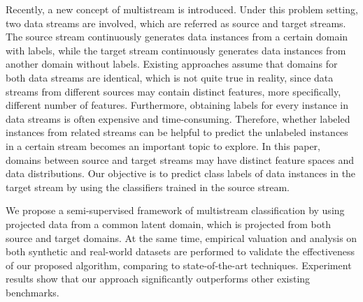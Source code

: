 Recently, a new concept of multistream is introduced. Under this problem setting, 
two data streams are involved, which are referred as source and target streams. The 
source stream continuously generates data instances from a certain domain with 
labels, while the target stream continuously generates data instances from another 
domain without labels. Existing approaches assume that domains for both data streams 
are identical, which is not quite true in reality, since data streams from different 
sources may contain distinct features, more specifically, different number of features. Furthermore, obtaining labels for every instance 
in data streams is often expensive and time-consuming. Therefore, whether labeled 
instances from related streams can be helpful to predict the unlabeled instances in 
a certain stream becomes an important topic to explore. In this paper, domains between 
source and target streams may have distinct feature spaces and data distributions. 
Our objective is to predict class labels of data instances in the target stream by 
using the classifiers trained in the source stream.

We propose a semi-supervised framework of multistream classification by using projected data from a common latent domain, which is projected from both source and target domains. At the same time, empirical valuation and analysis 
on both synthetic and real-world datasets are performed to validate the effectiveness 
of our proposed algorithm, comparing to state-of-the-art techniques. Experiment results 
show that our approach significantly outperforms other existing benchmarks.